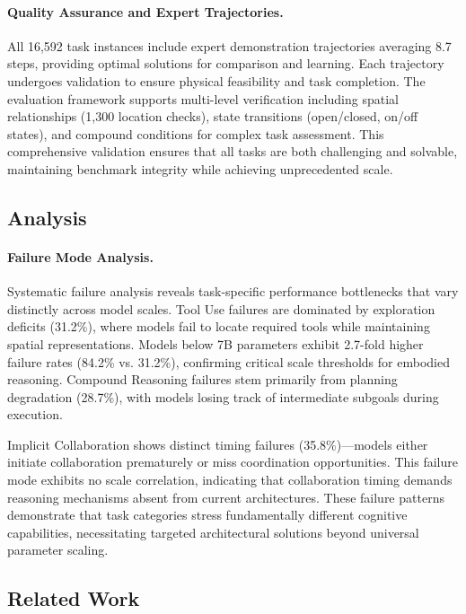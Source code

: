 \paragraph{Quality Assurance and Expert Trajectories.}
All 16,592 task instances include expert demonstration trajectories averaging 8.7 steps, providing optimal solutions for comparison and learning. Each trajectory undergoes validation to ensure physical feasibility and task completion. The evaluation framework supports multi-level verification including spatial relationships (1,300 location checks), state transitions (open/closed, on/off states), and compound conditions for complex task assessment. This comprehensive validation ensures that all tasks are both challenging and solvable, maintaining benchmark integrity while achieving unprecedented scale.


\subsection{Analysis}

\paragraph{Failure Mode Analysis.}
Systematic failure analysis reveals task-specific performance bottlenecks that vary distinctly across model scales. Tool Use failures are dominated by exploration deficits (31.2\%), where models fail to locate required tools while maintaining spatial representations. Models below 7B parameters exhibit 2.7-fold higher failure rates (84.2\% vs. 31.2\%), confirming critical scale thresholds for embodied reasoning. Compound Reasoning failures stem primarily from planning degradation (28.7\%), with models losing track of intermediate subgoals during execution.

Implicit Collaboration shows distinct timing failures (35.8\%)—models either initiate collaboration prematurely or miss coordination opportunities. This failure mode exhibits no scale correlation, indicating that collaboration timing demands reasoning mechanisms absent from current architectures. These failure patterns demonstrate that task categories stress fundamentally different cognitive capabilities, necessitating targeted architectural solutions beyond universal parameter scaling.

\subsection{Related Work}

